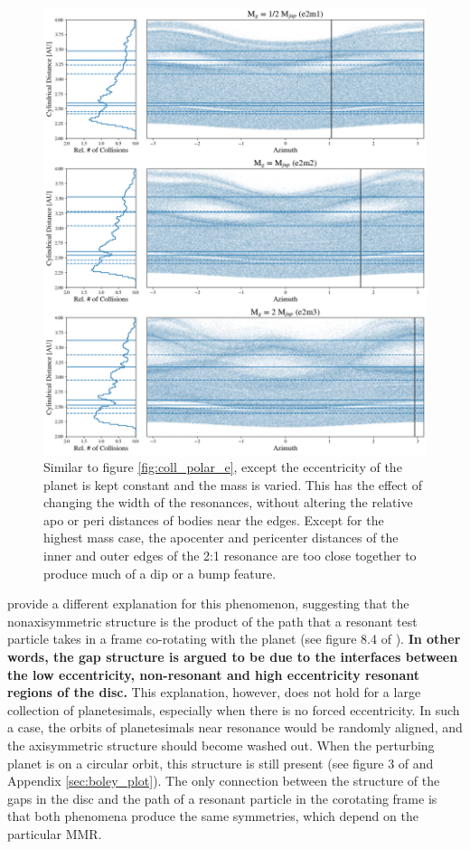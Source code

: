 \documentclass[fleqn,usenatbib]{mnras}
\begin{document}
\begin{figure}
    \includegraphics[width=\textwidth]{figures/coll_polar_m.png}
    \caption{Similar to figure \ref{fig:coll_polar_e}, except the eccentricity of the planet is kept constant and the mass is varied.
    This has the effect of changing the width of the resonances, without altering the relative apo or peri distances of
    bodies near the edges. Except for the highest mass case, the apocenter and pericenter distances of the inner and outer edges of the 2:1 
    resonance are too close together to produce much of a dip or a bump feature.\label{fig:coll_polar_m}}
\end{figure}

\citet{2016ApJ...818..159T} provide a different explanation for this phenomenon, suggesting that the nonaxisymmetric structure is the product 
of the path that a resonant test particle takes in a frame co-rotating with the planet (see figure 8.4 of \citet{1999ssd..book.....M}). \textbf{In other words, the gap structure is argued to be due to the interfaces between the low eccentricity, non-resonant and high eccentricity resonant regions of the disc.} This explanation, 
however, does not hold for a large collection of planetesimals, especially when there is no forced eccentricity. In such a case, the orbits of 
planetesimals near resonance would be randomly aligned, and the axisymmetric structure should become washed out. When the perturbing 
planet is on a circular orbit, this structure is still present (see figure 3 of \citet{2016ApJ...818..159T} and Appendix \ref{sec:boley_plot}). The only 
connection between the structure of the gaps in the disc and the path of a resonant particle in the corotating frame is that both phenomena produce the 
same symmetries, which depend on the particular MMR.
\end{document}
